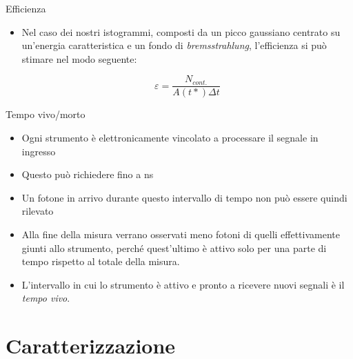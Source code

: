 \documentclass [xcolor=svgnames] {beamer}
\begin{document}
\begin{frame}{Efficienza}
	\begin{itemize}
		\item<1-> Nel caso dei nostri istogrammi, composti da un picco gaussiano centrato su un'energia caratteristica e un fondo di \emph{bremsstrahlung}, l'efficienza si può stimare nel modo seguente:
		
		\begin{equation}
			\varepsilon = \dfrac{N_{cont.}}{A(t*) \Delta t}
		\end{equation}
	
	\end{itemize}
\end{frame}

\begin{frame}{Tempo vivo/morto}
	\begin{itemize}
		\item Ogni strumento è elettronicamente vincolato a processare il segnale in ingresso
		\item Questo può richiedere fino a ns
		\item Un fotone in arrivo durante questo intervallo di tempo non può essere quindi rilevato
		\item Alla fine della misura verrano osservati meno fotoni di quelli effettivamente giunti allo strumento, perché quest'ultimo è attivo solo per una parte di tempo rispetto al totale della misura.
		\item L'intervallo in cui lo strumento è attivo e pronto a ricevere nuovi segnali è il \emph{tempo vivo}.
	\end{itemize}
\end{frame}

\section{Caratterizzazione}
\end{document}
